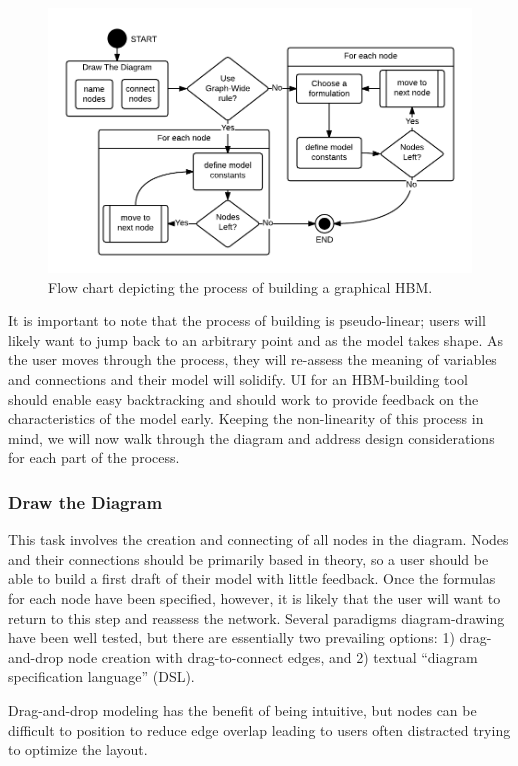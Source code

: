 \documentclass[conference]{IEEEtran}
\begin{document}
\begin{figure}[!t]
  \centering
  \includegraphics[width=0.9\columnwidth]{img/HBM-build-process}
  \caption{Flow chart depicting the process of building a graphical HBM.}
  \label{HBM-build-process}
\end{figure}

It is important to note that the process of building is pseudo-linear; users will likely want to jump back to an arbitrary point and as the model takes shape. 
As the user moves through the process, they will re-assess the meaning of variables and connections and their model will solidify. 
UI for an HBM-building tool should enable easy backtracking and should work to provide feedback on the characteristics of the model early. 
Keeping the non-linearity of this process in mind, we will now walk through the diagram and address design considerations for each part of the process.

\subsubsection{Draw the Diagram}
This task involves the creation and connecting of all nodes in the diagram. 
Nodes and their connections should be primarily based in theory, so a user should be able to build a first draft of their model with little feedback. 
Once the formulas for each node have been specified, however, it is likely that the user will want to return to this step and reassess the network. 
Several paradigms diagram-drawing have been well tested, but there are essentially two prevailing options:
1) drag-and-drop node creation with drag-to-connect edges, and 2) textual ``diagram specification language'' (DSL).

Drag-and-drop modeling has the benefit of being intuitive, but nodes can be difficult to position to reduce edge overlap leading to users often distracted trying to optimize the layout.
\end{document}
